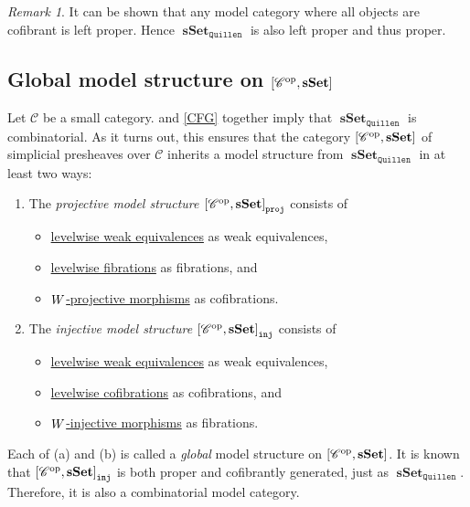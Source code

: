 \documentclass[10pt,letterpaper,cm]{nupset}
\theoremstyle{definition}
\theoremstyle{theorem}
\theoremstyle{remark}
\newtheorem{remark}[definition]{Remark}
\newcommand{\0}{\mathbf{0}}
\newcommand{\1}{\mathbf{1}}
\newcommand{\2}{\mathbf{2}}
\DeclareMathOperator{\op}{op}
\DeclareMathOperator{\sset}{\mathbf{sSet}}
\renewcommand{\c}{\mathscr{C}}
\DeclareMathOperator{\we}{\mathnormal{W}}
\newcommand{\bi}{\begin{itemize}}
\newcommand{\ei}{\end{itemize}}
\newcommand{\be}{\begin{enumerate}}
\newcommand{\ee}{\end{enumerate}}
\begin{document}
\begin{remark}
It can be shown that any model category where all objects are cofibrant is left proper. Hence $\sset_{\mathtt{Quillen}}$ is also left proper and thus proper.
\end{remark}

\subsection*{Global model structure on $\mleft[\c^{\op}, \sset\mright]$}

Let $\c$ be a small category.  and \cref{CFG} together imply that $\sset_{\mathtt{Quillen}}$ is combinatorial. As it turns out, this ensures that the category $\mleft[\c^{\op}, \sset\mright]$ of simplicial presheaves over $\c$ inherits a model structure from $\sset_{\mathtt{Quillen}}$ in at least two ways:

\be[label=(\alph*)]
\item The \textit{projective model structure  $\mleft[\c^{\op}, \sset\mright]_{\mathtt{proj}}$} consists of
\bi
\item \underline{levelwise weak equivalences} as weak equivalences,
\item \underline{levelwise fibrations} as fibrations, and
\item \underline{$\we$-projective morphisms} as cofibrations. 
\ei
\item The \textit{injective model structure $\mleft[\c^{\op}, \sset\mright]_{\mathtt{inj}}$} consists of
\bi
\item \underline{levelwise weak equivalences} as weak equivalences,
\item \underline{levelwise cofibrations} as cofibrations, and
\item  \underline{$\we$-injective morphisms} as fibrations. 
\ei
\ee

Each of (a) and (b) is called a \textit{global} model structure on $\mleft[\c^{\op}, \sset\mright]$. It is known that $\mleft[\c^{\op}, \sset\mright]_{\mathtt{inj}}$ is both proper and cofibrantly generated, just as $\sset_{\mathtt{Quillen}}$. Therefore, it is also a combinatorial model category.


\begin{comment}
\subsection{Reedy categories}


	
\end{comment}
\end{document}
